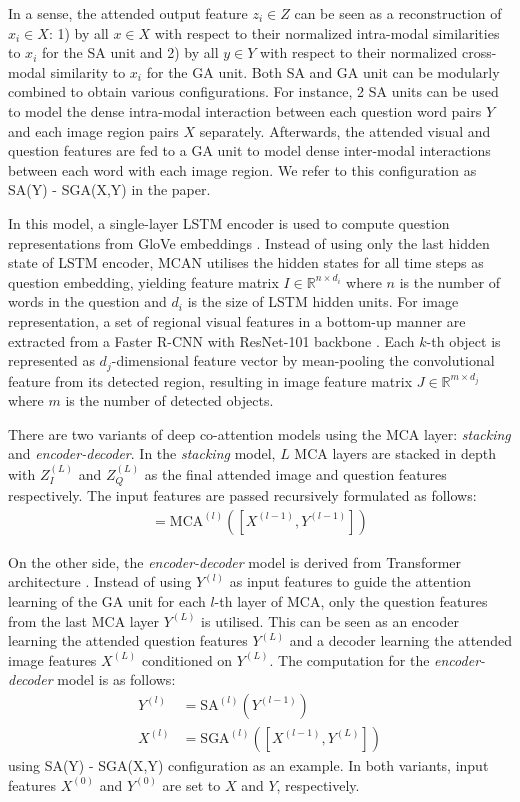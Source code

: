 \documentclass{article}
\begin{document}
In a sense, the attended output feature $z_{i} \in Z$ can be seen as a reconstruction of $x_{i} \in X$: 1) by all $x \in X$ with respect to their normalized intra-modal similarities to $x_{i}$ for the SA unit and 2) by all $y \in Y$ with respect to their normalized cross-modal similarity to $x_{i}$ for the GA unit. Both SA and GA unit can be modularly combined to obtain various configurations. For instance, 2 SA units can be used to model the dense intra-modal interaction between each question word pairs $Y$ and each image region pairs $X$ separately. Afterwards, the attended visual and question features are fed to a GA unit to model dense inter-modal interactions between each word with each image region. We refer to this configuration as SA(Y) - SGA(X,Y) in the paper.

In this model, a single-layer LSTM encoder \citep{lstm} is used to compute question representations from GloVe embeddings \citep{pennington2014glove}. Instead of using only the last hidden state of LSTM encoder, MCAN utilises the hidden states for all time steps as question embedding, yielding feature matrix $I \in \mathbb{R}^{n \times d_{i}}$ where $n$ is the number of words in the question and $d_{i}$ is the size of LSTM hidden units. For image representation, a set of regional visual features in a bottom-up manner \citep{Anderson_2018_CVPR} are extracted from a Faster R-CNN \citep{faster_rcnn} with ResNet-101 backbone \citep{residual}. Each $k$-th object is represented as $d_{j}$-dimensional feature vector by mean-pooling the convolutional feature from its detected region, resulting in image feature matrix $J \in \mathbb{R}^{m \times d_{j}}$ where $m$ is the number of detected objects.

There are two variants of deep co-attention models using the MCA layer: \textit{stacking} and \textit{encoder-decoder}. In the \textit{stacking} model, $L$ MCA layers are stacked in depth with $Z_{I}^{(L)}$ and $Z_{Q}^{(L)}$ as the final attended image and question features respectively. The input features are passed recursively formulated as follows:
\begin{align}
    [X^{(l)}, Y^{(l)}] = \text{MCA}^{(l)}([X^{(l-1)}, Y^{(l-1)}])
\end{align}

On the other side, the \textit{encoder-decoder} model is derived from Transformer architecture \citep{transformers}. Instead of using $Y^{(l)}$ as input features to guide the attention learning of the GA unit for each $l$-th layer of MCA, only the question features from the last MCA layer $Y^{(L)}$ is utilised. This can be seen as an encoder learning the attended question features $Y^{(L)}$ and a decoder learning the attended image features $X^{(L)}$ conditioned on $Y^{(L)}$. The computation for the \textit{encoder-decoder} model is as follows:
\begin{align}
    Y^{(l)} &= \text{SA}^{(l)}(Y^{(l-1)}) \\
    X^{(l)} &= \text{SGA}^{(l)}([X^{(l-1)}, Y^{(L)}])
\end{align}
using SA(Y) - SGA(X,Y) configuration as an example. In both variants, input features $X^{(0)}$ and $Y^{(0)} $ are set to $X$ and $Y$, respectively.
\end{document}
